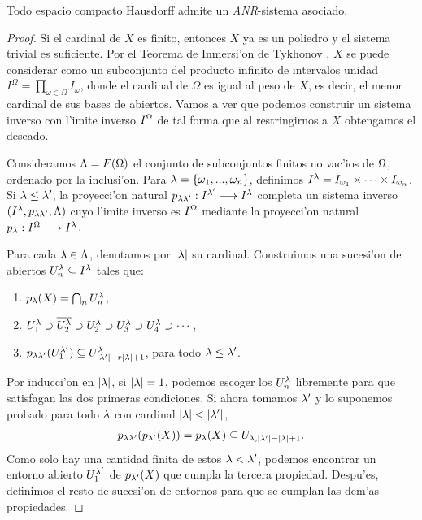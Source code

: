 \begin{theorem}\label{teoremavietoris}
  Todo espacio compacto Hausdorff admite un \emph{ANR}-sistema asociado.
\end{theorem}
\begin{proof}
  Si el cardinal de $ X  $ es finito, entonces $ X  $ ya es un poliedro y el sistema trivial es suficiente. Por el Teorema de Inmersi'on de Tykhonov \cite[17.11]{willard1970general}, $ X  $ se puede considerar como un subconjunto del producto infinito de intervalos unidad $ I^\Omega  = \prod_{\omega\in \Omega}I_\omega  $, donde el cardinal de $ \Omega  $ es igual al peso de $ X  $, es decir, el menor cardinal de sus bases de abiertos. Vamos a ver que podemos construir un sistema inverso con l'imite inverso $ I^{\Omega } $ de tal forma que al restringirnos a $ X  $ obtengamos el deseado.
  
  Consideramos $ \Lambda = F(\Omega ) $ el conjunto de subconjuntos finitos no vac'ios de $ \Omega $, ordenado por la inclusi'on. Para $ \lambda = \{\omega_1,...,\omega_n\} $, definimos $ I^\lambda = I_{\omega_1}\times\cdots \times I_{\omega_n } $. Si $ \lambda\leq \lambda'  $, la proyecci'on natural $ p_{\lambda\lambda'}:I^{\lambda'}\longrightarrow I^\lambda  $ completa un sistema inverso $ (I^\lambda,p_{\lambda\lambda'},\Lambda ) $ cuyo l'imite inverso es $ I^\Omega $ mediante la proyecci'on natural $ p_\lambda:I^\Omega\longrightarrow I^\lambda  $.

  Para cada $ \lambda\in \Lambda  $, denotamos por $  \abs{\lambda} $ su cardinal. Construimos una sucesi'on de abiertos $ U^\lambda_n\subseteq I^\lambda  $ tales que:
  \begin{enumerate}
    \item $ p_\lambda (X) = \bigcap_n U_n ^\lambda  $,
    \item $ U^\lambda_1 \supset \overline{U^\lambda_2}\supset U^\lambda_2 \supset U_{3}^\lambda \supset U_4^\lambda \supset \cdots  $,
    \item $ p_{\lambda\lambda'}(U^{\lambda'}_1)\subseteq U^\lambda_{\abs{\lambda'}-r\abs{\lambda}+1} $, para todo $ \lambda\leq \lambda'  $.
  \end{enumerate}
  Por inducci'on en $ \abs{\lambda} $, si $ \abs{\lambda} = 1 $, podemos escoger los $ U_n^\lambda  $ libremente para que satisfagan las dos primeras condiciones. Si ahora tomamos $ \lambda'$ y  lo suponemos probado para todo $ \lambda  $ con cardinal $  \abs{\lambda}<\abs{\lambda' } $, 
  \begin{gather*}
    p_{\lambda\lambda'}(p_{\lambda'}(X)) = p_\lambda(X) \subseteq U_{\lambda,\abs{\lambda'}-\abs{\lambda}+1}.
  \end{gather*}
  Como solo hay una cantidad finita de estos $ \lambda <\lambda'   $, podemos encontrar un entorno abierto $ U_1^{\lambda' } $ de $ p_{\lambda'}(X ) $ que cumpla la tercera propiedad. Despu'es, definimos el resto de sucesi'on de entornos para que se cumplan las dem'as propiedades.


\end{proof}
